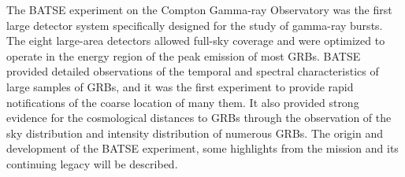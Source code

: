 


\bigskip



\bigskip

\noindent The BATSE experiment on the Compton Gamma-ray Observatory was the first large detector system specifically designed for the study of gamma-ray bursts. The eight large-area detectors allowed full-sky coverage and were optimized to operate in the energy region of the peak emission of most GRBs.  BATSE provided detailed observations of the temporal and spectral characteristics of large samples of GRBs, and it was the first experiment to provide rapid notifications of the coarse location of many them.  It also provided strong evidence for the cosmological distances to GRBs through the observation of the sky distribution and intensity distribution of numerous GRBs.  The origin and development of the BATSE experiment, some highlights from the mission and its continuing legacy will be described.


